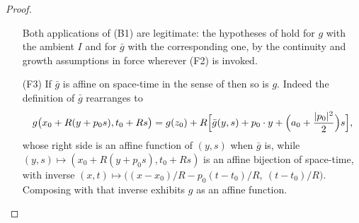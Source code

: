 \begin{proof}
\begin{enumerate}
Both applications of (B1) are legitimate: the hypotheses of
 hold for $g$ with the ambient $I$ and for
$\bar g$ with the corresponding one, by the continuity and growth assumptions in
force wherever (F2) is invoked.
\item[(F3)] If $\bar g$ is affine on space-time in the sense of
 then so is $g$. Indeed the definition of $\bar g$
rearranges to
\[
  g\bigl(x_0+R(y+p_0s),t_0+Rs\bigr)
   =g(z_0)+R\Bigl[\bar g(y,s)+p_0\cdot y
        +\Bigl(a_0+\frac{|p_0|^2}{2}\Bigr)s\Bigr],
\]
whose right side is an affine function of $(y,s)$ when $\bar g$ is, while
$(y,s)\mapsto(x_0+R(y+p_0s),t_0+Rs)$ is an affine bijection of space-time, with
inverse $(x,t)\mapsto\bigl((x-x_0)/R-p_0(t-t_0)/R,\ (t-t_0)/R\bigr)$. Composing
with that inverse exhibits $g$ as an affine function.
\end{enumerate}


\end{proof}
